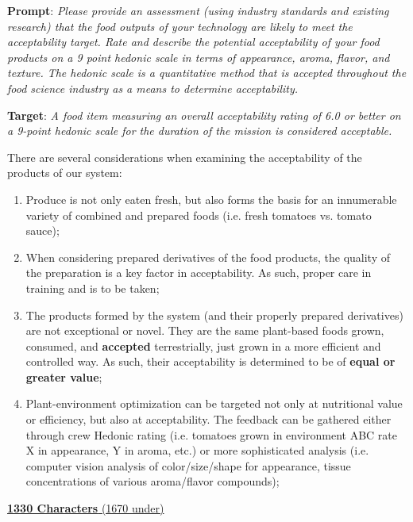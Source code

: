 \documentclass{../tex/report}
\begin{document}
\textbf{Prompt}: \textit{Please provide an assessment (using industry standards and existing research) that the food outputs of your technology are likely to meet the acceptability target. Rate and describe the potential acceptability of your food products on a 9 point hedonic scale in terms of appearance, aroma, flavor, and texture. The hedonic scale is a quantitative method that is accepted throughout the food science industry as a means to determine acceptability.}

\textbf{Target}: \textit{A food item measuring an overall acceptability rating of 6.0 or better on a 9-point hedonic scale for the duration of the mission is considered acceptable.}


There are several considerations when examining the acceptability of the products of our system:

\begin{enumerate}
    \item Produce is not only eaten fresh, but also forms the basis for an innumerable variety of combined and prepared foods (i.e. fresh tomatoes vs. tomato sauce);
    \item When considering prepared derivatives of the food products, the quality of the preparation is a key factor in acceptability. As such, proper care in training and is to be taken;
    \item The products formed by the system (and their properly prepared derivatives) are not exceptional or novel. They are the same plant-based foods grown, consumed, and \textbf{accepted} terrestrially, just grown in a more efficient and controlled way. As such, their acceptability is determined to be of \textbf{equal or greater value};
    \item Plant-environment optimization can be targeted not only at nutritional value or efficiency, but also at acceptability. The feedback can be gathered either through crew Hedonic rating (i.e. tomatoes grown in environment ABC rate X in appearance, Y in aroma, etc.) or more sophisticated analysis (i.e. computer vision analysis of color/size/shape for appearance, tissue concentrations of various aroma/flavor compounds); %
\end{enumerate}

\uline{\textbf{1330 Characters} (1670 under)}

\end{document}
